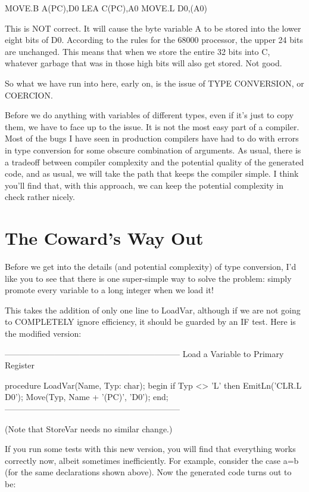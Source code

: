 \documentclass[float=false, crop=false]{standalone}
\begin{document}
     MOVE.B A(PC),D0
     LEA  C(PC),A0
     MOVE.L D0,(A0)


This is NOT correct. It will cause the byte variable A to be stored into the
lower eight bits of D0. According to the rules for the 68000 processor, the
upper 24 bits are unchanged. This means that when we store the entire 32 bits
into C, whatever garbage that was in those high bits will also get stored. Not
good.

So what we have run into here, early on, is the issue of TYPE CONVERSION, or
COERCION.

Before we do anything with variables of different types, even if it's just to
copy them, we have to face up to the issue. It is not the most easy part of a
compiler. Most of the bugs I have seen in production compilers have had to do
with errors in type conversion for some obscure combination of arguments. As
usual, there is a tradeoff between compiler complexity and the potential quality
of the generated code, and as usual, we will take the path that keeps the
compiler simple. I think you'll find that, with this approach, we can keep the
potential complexity in check rather nicely.


\section{The Coward's Way Out}

Before we get into the details (and potential complexity) of type conversion,
I'd like you to see that there is one super-simple way to solve the problem:
simply promote every variable to a long integer when we load it!

This takes the addition of only one line to LoadVar, although if we are not
going to COMPLETELY ignore efficiency, it should be guarded by an IF test. Here
is the modified version:


{---------------------------------------------------------------}
{ Load a Variable to Primary Register }

procedure LoadVar(Name, Typ: char);
begin
   if Typ <> 'L' then
      EmitLn('CLR.L D0');
   Move(Typ, Name + '(PC)', 'D0');
end;
{---------------------------------------------------------------}


(Note that StoreVar needs no similar change.)

If you run some tests with this new version, you will find that everything works
correctly now, albeit sometimes inefficiently. For example, consider the case
a=b (for the same declarations shown above). Now the generated code turns out to
be:
\end{document}
